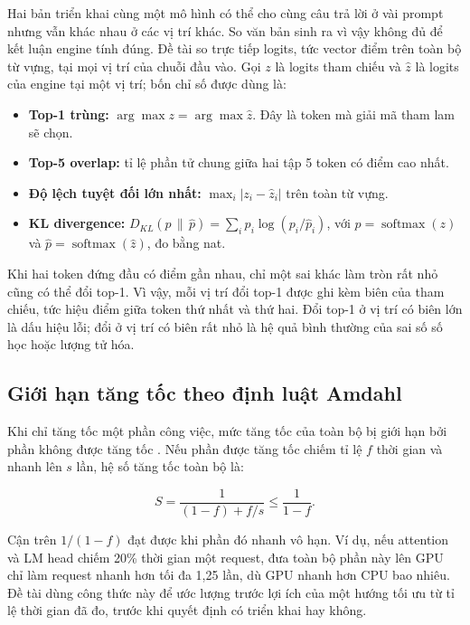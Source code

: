 Hai bản triển khai cùng một mô hình có thể cho cùng câu trả lời ở vài prompt nhưng vẫn khác nhau ở các vị trí khác. So văn bản sinh ra vì vậy không đủ để kết luận engine tính đúng. Đề tài so trực tiếp logits, tức vector điểm trên toàn bộ từ vựng, tại mọi vị trí của chuỗi đầu vào. Gọi $z$ là logits tham chiếu và $\hat z$ là logits của engine tại một vị trí; bốn chỉ số được dùng là:

\begin{itemize}
\item \textbf{Top-1 trùng:} $\arg\max z=\arg\max\hat z$. Đây là token mà giải mã tham lam sẽ chọn.
\item \textbf{Top-5 overlap:} tỉ lệ phần tử chung giữa hai tập 5 token có điểm cao nhất.
\item \textbf{Độ lệch tuyệt đối lớn nhất:} $\max_i|z_i-\hat z_i|$ trên toàn từ vựng.
\item \textbf{KL divergence:} $D_{KL}(p\,\|\,\hat p)=\sum_i p_i\log(p_i/\hat p_i)$, với $p=\operatorname{softmax}(z)$ và $\hat p=\operatorname{softmax}(\hat z)$, đo bằng nat.
\end{itemize}

Khi hai token đứng đầu có điểm gần nhau, chỉ một sai khác làm tròn rất nhỏ cũng có thể đổi top-1. Vì vậy, mỗi vị trí đổi top-1 được ghi kèm biên của tham chiếu, tức hiệu điểm giữa token thứ nhất và thứ hai. Đổi top-1 ở vị trí có biên lớn là dấu hiệu lỗi; đổi ở vị trí có biên rất nhỏ là hệ quả bình thường của sai số số học hoặc lượng tử hóa.

\subsection{Giới hạn tăng tốc theo định luật Amdahl}

Khi chỉ tăng tốc một phần công việc, mức tăng tốc của toàn bộ bị giới hạn bởi phần không được tăng tốc \cite{amdahl}. Nếu phần được tăng tốc chiếm tỉ lệ $f$ thời gian và nhanh lên $s$ lần, hệ số tăng tốc toàn bộ là:

\begin{equation}
\label{eq:amdahl}
S=\frac{1}{(1-f)+f/s}\leq\frac{1}{1-f}.
\end{equation}

Cận trên $1/(1-f)$ đạt được khi phần đó nhanh vô hạn. Ví dụ, nếu attention và LM head chiếm 20\% thời gian một request, đưa toàn bộ phần này lên GPU chỉ làm request nhanh hơn tối đa 1,25 lần, dù GPU nhanh hơn CPU bao nhiêu. Đề tài dùng công thức này để ước lượng trước lợi ích của một hướng tối ưu từ tỉ lệ thời gian đã đo, trước khi quyết định có triển khai hay không.

